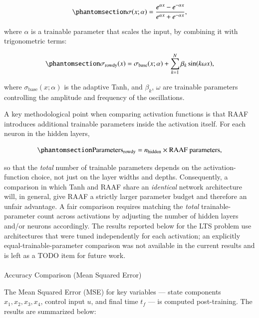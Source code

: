 \documentclass[
  number,
  preprint]{elsarticle}
\makeatletter
\let\oldparagraph\paragraph
\renewcommand{\paragraph}{
    \@ifstar
      \xxxParagraphStar
      \xxxParagraphNoStar
  }
\newcommand{\xxxParagraphStar}[1]{\oldparagraph*{#1}\mbox{}}
\newcommand{\xxxParagraphNoStar}[1]{\oldparagraph{#1}\mbox{}}
\makeatother
\begin{document}
\begin{equation}\protect\phantomsection\label{eq-ch3-modified-tanh}{
\sigma(x; \alpha) = \frac{e^{\alpha x} - e^{-\alpha x}}{e^{\alpha x} + e^{-\alpha x}},
}\end{equation}

where \(\alpha\) is a trainable parameter that scales the input, by
combining it with trigonometric terms:

\begin{equation}\protect\phantomsection\label{eq-ch3-raaf}{
\sigma_{\text{rowdy}}(x) = \sigma_{\text{base}}(x; \alpha) + \sum_{k=1}^N \beta_k \sin(k \omega x),
}\end{equation}

where \(\sigma_{\text{base}}(x; \alpha)\) is the adaptive Tanh, and
\(\beta_k\), \(\omega\) are trainable parameters controlling the
amplitude and frequency of the oscillations.

A key methodological point when comparing activation functions is that
RAAF introduces additional trainable parameters inside the activation
itself. For each neuron in the hidden layers,

\begin{equation}\protect\phantomsection\label{eq-ch3-raaf-extra}{
\text{Parameters}_\text{rowdy} = n_\text{hidden} \times \text{RAAF parameters},
}\end{equation}

so that the \emph{total} number of trainable parameters depends on the
activation-function choice, not just on the layer widths and depths.
Consequently, a comparison in which Tanh and RAAF share an
\emph{identical} network architecture will, in general, give RAAF a
strictly larger parameter budget and therefore an unfair advantage. A
fair comparison requires matching the \emph{total} trainable-parameter
count across activations by adjusting the number of hidden layers and/or
neurons accordingly. The results reported below for the LTS problem use
architectures that were tuned independently for each activation; an
explicitly equal-trainable-parameter comparison was not available in the
current results and is left as a TODO item for future work.

\paragraph{Accuracy Comparison (Mean Squared
Error)}\label{accuracy-comparison-mean-squared-error}

The Mean Squared Error (MSE) for key variables --- state components
\(x_1, x_2, x_3, x_4\), control input \(u\), and final time \(t_f\) ---
is computed post-training. The results are summarized below:
\end{document}
